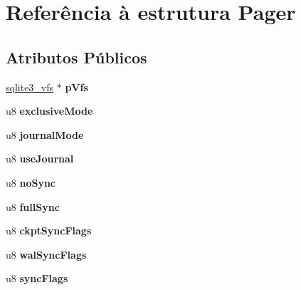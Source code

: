 \hypertarget{struct_pager}{\section{Referência à estrutura Pager}
\label{struct_pager}
}
\subsection*{Atributos Públicos}
\begin{DoxyCompactItemize}
\item 
\hypertarget{struct_pager_affa78e08a7f691a4c8f7043e0b4c9212}{\hyperlink{structsqlite3__vfs}{sqlite3\-\_\-vfs} $\ast$ {\bfseries p\-Vfs}}\label{struct_pager_affa78e08a7f691a4c8f7043e0b4c9212}

\item 
\hypertarget{struct_pager_a5cbccc156e07d6226cb65a7ab05ac116}{u8 {\bfseries exclusive\-Mode}}\label{struct_pager_a5cbccc156e07d6226cb65a7ab05ac116}

\item 
\hypertarget{struct_pager_a9ad7bd09f1c9323d943ee17ddf42e46e}{u8 {\bfseries journal\-Mode}}\label{struct_pager_a9ad7bd09f1c9323d943ee17ddf42e46e}

\item 
\hypertarget{struct_pager_af7783f866150d7e322c28cb324ad85d6}{u8 {\bfseries use\-Journal}}\label{struct_pager_af7783f866150d7e322c28cb324ad85d6}

\item 
\hypertarget{struct_pager_ae943093a3ccbfbf264ccf3c8a52edac1}{u8 {\bfseries no\-Sync}}\label{struct_pager_ae943093a3ccbfbf264ccf3c8a52edac1}

\item 
\hypertarget{struct_pager_abae5c9c3d85120ae266acc4c9a355b86}{u8 {\bfseries full\-Sync}}\label{struct_pager_abae5c9c3d85120ae266acc4c9a355b86}

\item 
\hypertarget{struct_pager_a4543ec92953e7bda49b3ed4f0bdab890}{u8 {\bfseries ckpt\-Sync\-Flags}}\label{struct_pager_a4543ec92953e7bda49b3ed4f0bdab890}

\item 
\hypertarget{struct_pager_aa8c8c2d893e4d2165f089ddde3e85103}{u8 {\bfseries wal\-Sync\-Flags}}\label{struct_pager_aa8c8c2d893e4d2165f089ddde3e85103}

\item 
\hypertarget{struct_pager_ac7f90d27da63090369a0e44a0bceb525}{u8 {\bfseries sync\-Flags}}\label{struct_pager_ac7f90d27da63090369a0e44a0bceb525}


\end{DoxyCompactItemize}
